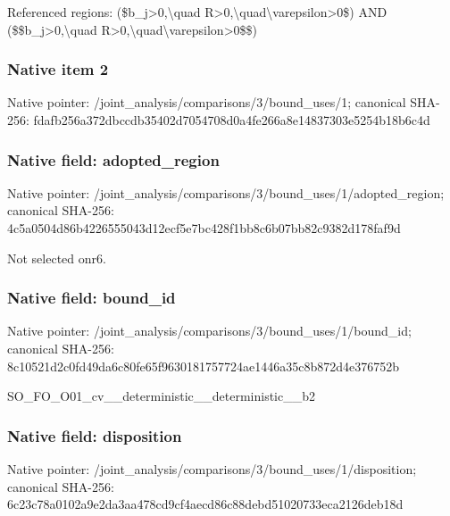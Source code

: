 \documentclass[10pt,a4paper]{article}
\begin{document}
\begingroup\raggedright\sloppy Referenced regions:\allowbreak{} (\$b\_\allowbreak{}j>0,\allowbreak{}\textbackslash{}quad R>0,\allowbreak{}\textbackslash{}quad\textbackslash{}varepsilon>0\$) AND (\$\$b\_\allowbreak{}j>0,\allowbreak{}\textbackslash{}quad R>0,\allowbreak{}\textbackslash{}quad\textbackslash{}varepsilon>0\$\$)\par\endgroup

\subsubsection{Native item 2}
Native pointer: /joint\_\allowbreak{}analysis/comparisons/3/bound\_\allowbreak{}uses/1; canonical SHA-256: fdafb256a372dbccdb35402d7054708d0a4fe266a8e14837303e5254b18b6c4d

\subsubsection{Native field: adopted\_\allowbreak{}region}
Native pointer: /joint\_\allowbreak{}analysis/comparisons/3/bound\_\allowbreak{}uses/1/adopted\_\allowbreak{}region; canonical SHA-256: 4c5a0504d86b4226555043d12ecf5e7bc428f1bb8c6b07bb82c9382d178faf9d

\begingroup\raggedright\sloppy Not selected onr6.\par\endgroup

\subsubsection{Native field: bound\_\allowbreak{}id}
Native pointer: /joint\_\allowbreak{}analysis/comparisons/3/bound\_\allowbreak{}uses/1/bound\_\allowbreak{}id; canonical SHA-256: 8c10521d2c0fd49da6c80fe65f9630181757724ae1446a35c8b872d4e376752b

\begingroup\raggedright\sloppy SO\_\allowbreak{}FO\_\allowbreak{}O01\_\allowbreak{}cv\_\allowbreak{}\_\allowbreak{}deterministic\_\allowbreak{}\_\allowbreak{}deterministic\_\allowbreak{}\_\allowbreak{}b2\par\endgroup

\subsubsection{Native field: disposition}
Native pointer: /joint\_\allowbreak{}analysis/comparisons/3/bound\_\allowbreak{}uses/1/disposition; canonical SHA-256: 6c23c78a0102a9e2da3aa478cd9cf4aecd86c88debd51020733eca2126deb18d
\end{document}
